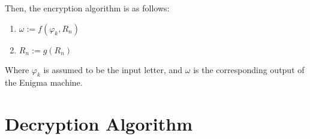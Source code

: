 \documentclass[12pt,a4paper]{article}
\begin{document}
	Then, the encryption algorithm is as follows:
	
	\begin{enumerate}
		\item $\omega := f(\varphi_k, R_n)$
		\item $R_n := g(R_n)$
	\end{enumerate}

	Where $\varphi_k$ is assumed to be the input letter, and $\omega$ is the corresponding output of the Enigma machine. 

	\section{Decryption Algorithm}
	\blindtext
\end{document}
